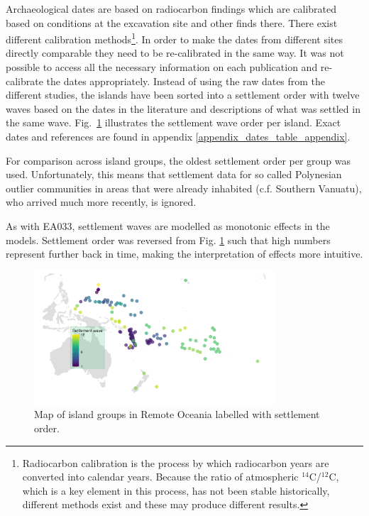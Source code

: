 \documentclass[unnumsec,webpdf,modern,medium]{oup-authoring-template}
\begin{document}
Archaeological dates are based on radiocarbon findings which are calibrated based on conditions at the excavation site and other finds there. There exist different calibration methods\footnote{Radiocarbon calibration is the process by which radiocarbon years are converted into calendar years. Because the ratio of atmospheric $^{14}$C/$^{12}$C, which is a key element in this process, has not been stable historically, different methods exist and these may produce different results.}. In order to make the dates from different sites directly comparable they need to be re-calibrated in the same way. It was not possible to access all the necessary information on each publication and re-calibrate the dates appropriately. Instead of using the raw dates from the different studies, the islands have been sorted into a settlement order with twelve waves based on the dates in the literature and descriptions of what was settled in the same wave. Fig.~\ref{appendix_dates_map} illustrates the settlement wave order per island. Exact dates and references are found in appendix \ref{appendix_dates_table_appendix}.

For comparison across island groups, the oldest settlement order per group was used. Unfortunately, this means that settlement data for so called Polynesian outlier communities in areas that were already inhabited (c.f. Southern Vanuatu), who arrived much more recently, is ignored.

As with EA033, settlement waves are modelled as monotonic effects in the models. Settlement order was reversed from Fig. \ref{appendix_dates_map} such that high numbers represent further back in time, making the interpretation of effects more intuitive. 

\begin{figure}
\centering
\includegraphics[width=0.8\textwidth]{Map_RO_dates.png}
\caption{{Map of island groups in Remote Oceania labelled with settlement order.}}
\label{appendix_dates_map}
\end{figure}
\end{document}
